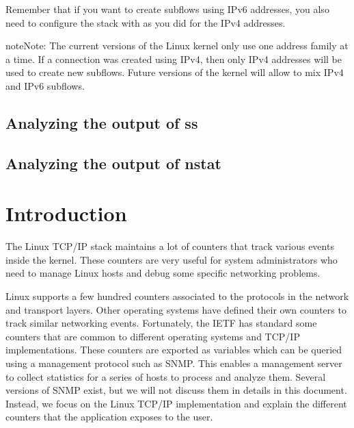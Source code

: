 \documentclass[letterpaper,10pt,english]{sphinxmanual}
\begin{document}
\sphinxAtStartPar
Remember that if you want to create subflows using IPv6 addresses, you also need to configure the stack with  as you did for the IPv4 addresses.

\begin{sphinxadmonition}{note}{Note:}
\sphinxAtStartPar
The current versions of the Linux kernel only use one address family at a time. If a connection was created using IPv4, then only IPv4 addresses will be used to create new subflows. Future versions of the kernel will allow to mix IPv4 and IPv6 subflows.
\end{sphinxadmonition}


\section{Analyzing the output of ss}
\label{\detokenize{mptcp-linux:analyzing-the-output-of-ss}}

\section{Analyzing the output of nstat}
\label{\detokenize{mptcp-linux:analyzing-the-output-of-nstat}}

\chapter{Introduction}
\label{\detokenize{nstat-intro:introduction}}\label{\detokenize{nstat-intro::doc}}
\sphinxAtStartPar
The Linux TCP/IP stack maintains a lot of counters that track various
events inside the kernel. These counters are very useful for system
administrators who need to manage Linux hosts and debug some specific
networking problems.

\sphinxAtStartPar
Linux supports a few hundred counters associated to the protocols in the
network and transport layers. Other operating systems have defined their
own counters to track similar networking events. Fortunately, the IETF
has standard some counters that are common to different operating
systems and TCP/IP implementations. These counters are exported as
variables which can be queried using a management protocol such as SNMP.
This enables a management server to collect statistics for a series of
hosts to process and analyze them.  Several versions of SNMP exist, but
we will not discuss them in details in this document. Instead, we
focus on the Linux TCP/IP implementation and explain the different counters
that the 
application exposes to the user.
\end{document}
